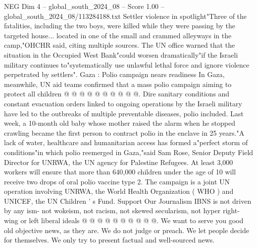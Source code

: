 \begin{textsample}{NEG Dim 4 – global\_south\_2024\_08 – Score 1.00 – global\_south\_2024\_08/113284188.txt}
Settler violence in spotlight"Three of the fatalities, including the two boys, were killed while they were passing by the targeted house... located in one of the small and crammed alleyways in the camp,"OHCHR said, citing multiple sources.
The UN office warned that the situation in the Occupied West Bank"could worsen dramatically"if the Israeli military continues to"systematically use unlawful lethal force and ignore violence perpetrated by settlers".
Gaza : Polio campaign nears readiness In Gaza, meanwhile, UN aid teams confirmed that a mass polio campaign aiming to protect all children @ @ @ @ @ @ @ @ @ @.
Dire sanitary conditions and constant evacuation orders linked to ongoing operations by the Israeli military have led to the outbreaks of multiple preventable diseases, polio included.
Last week, a 10-month old baby whose mother raised the alarm when he stopped crawling became the first person to contract polio in the enclave in 25 years."A lack of water, healthcare and humanitarian access has formed a"perfect storm of conditions"in which polio reemerged in Gaza,"said Sam Rose, Senior Deputy Field Director for UNRWA, the UN agency for Palestine Refugees.
At least 3,000 workers will ensure that more than 640,000 children under the age of 10 will receive two drops of oral polio vaccine type 2.
The campaign is a joint UN operation involving UNRWA, the World Health Organization ( WHO ) and UNICEF, the UN Children ' s Fund.
Support Our Journalism IBNS is not driven by any ism- not wokeism, not racism, not skewed secularism, not hyper right-wing or left liberal ideals @ @ @ @ @ @ @ @ @ @.
We want to serve you good old objective news, as they are.
We do not judge or preach.
We let people decide for themselves.
We only try to present factual and well-sourced news.

\end{textsample}
